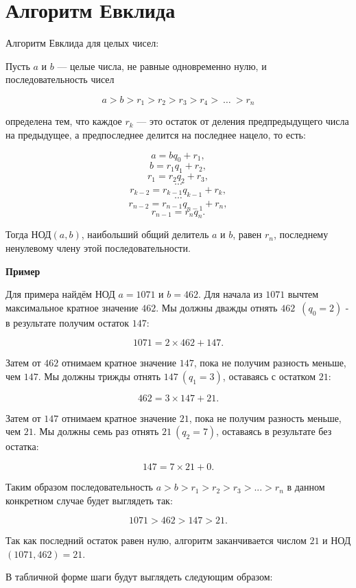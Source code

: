 \documentclass[12pt,a4paper]{scrartcl}
\begin{document}
	
\section{Алгоритм Евклида}

Алгоритм Евклида для целых чисел:

Пусть $a$ и $b$ — целые числа, не равные одновременно нулю, и последовательность чисел

$$a>b>r_{1}>r_{2}>r_{3}>r_{4}>\ \dots \ >r_{n}$$

определена тем, что каждое $r_{k}$ — это остаток от деления предпредыдущего числа на предыдущее, а предпоследнее делится на последнее нацело, то есть:

$$a=bq_{0}+r_{1},$$
$$b=r_{1}q_{1}+r_{2},$$
$$r_{1}=r_{2}q_{2}+r_{3},$$
$$\cdots $$
$$r_{k-2}=r_{k-1}q_{k-1}+r_{k},$$
$$\cdots $$
$$r_{n-2}=r_{n-1}q_{n-1}+r_{n},$$
$$r_{n-1}=r_{n}q_{n}.$$

Тогда НОД$(a, b)$, наибольший общий делитель $a$ и $b$, равен $r_n$, последнему ненулевому члену этой последовательности. 

\textbf{Пример}

Для примера найдём НОД $a = 1071$ и $b = 462$. Для начала из $1071$ вычтем максимальное кратное значение $462$. Мы должны дважды отнять $462$\ $(q_0 = 2)$ - в результате получим остаток $147$:

$$1071 = 2 \times 462 + 147.$$

Затем от $462$ отнимаем кратное значение $147$, пока не получим разность меньше, чем $147$. Мы должны трижды отнять $147\ (q_1 = 3)$, оставаясь с остатком $21$:

$$462 = 3 \times 147 + 21.$$

Затем от $147$ отнимаем кратное значение $21$, пока не получим разность меньше, чем $21$. Мы должны семь раз отнять $21\ (q_2 = 7)$, оставаясь в результате без остатка:

$$147 = 7 \times 21 + 0.$$

Таким образом последовательность $a > b > r_1 > r_2 > r_3 > ... > r_n$ в данном конкретном случае будет выглядеть так:

$$1071 > 462 > 147 > 21.$$


Так как последний остаток равен нулю, алгоритм заканчивается числом $21$ и НОД$(1071, 462) = 21$.

В табличной форме шаги будут выглядеть следующим образом:
\end{document}
